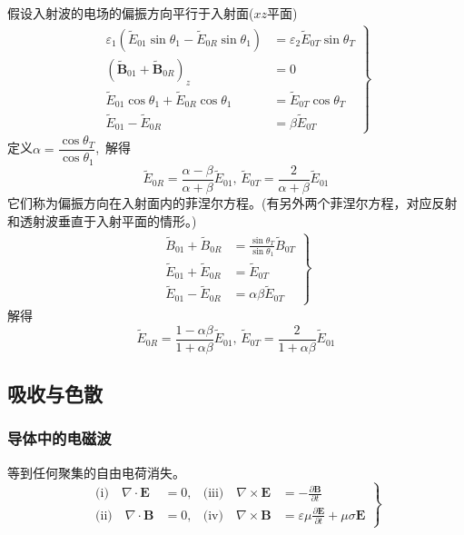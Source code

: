 假设入射波的电场的偏振方向平行于入射面($xz$平面)
\begin{align*}
\left.\begin{aligned}
\varepsilon_1\left(\widetilde{{E}}_{01}\sin\theta_1-\widetilde{{E}}_{0R}\sin\theta_1\right)&= \varepsilon_2\widetilde{{E}}_{0T}\sin\theta_T\\
\left(\widetilde{\boldsymbol{B}}_{01}+\widetilde{\boldsymbol{B}}_{0R}\right)_z&=0\\
\widetilde{{E}}_{01}\cos\theta_1+\widetilde{{E}}_{0R}\cos\theta_1&= \widetilde{{E}}_{0T}\cos\theta_T\\
\widetilde{E}_{01}-\widetilde{E}_{0R}&= \beta\widetilde{E}_{0T}
\end{aligned}\right\}
\end{align*}
定义$\alpha=\dfrac{\cos\theta_T}{\cos\theta_1}$,\, 解得
\begin{equation}
    \widetilde{E}_{0R}=\frac{\alpha-\beta}{\alpha+\beta}\widetilde{E}_{01},\, \widetilde{E}_{0T}=\frac{2}{\alpha+\beta}\widetilde{E}_{01}\label{偏振方向在入射面内的菲涅尔方程}
\end{equation}
它们称为偏振方向在入射面内的菲涅尔方程。(有另外两个菲涅尔方程，对应反射和透射波垂直于入射平面的情形。)
\begin{align*}
\left.\begin{aligned}
\widetilde{B}_{01}+\widetilde{B}_{0R}&=\frac{\sin\theta_T}{\sin\theta_1} \widetilde{B}_{0T}\\
\widetilde{{E}}_{01}+\widetilde{{E}}_{0R}&= \widetilde{{E}}_{0T}\\
\widetilde{E}_{01}-\widetilde{E}_{0R}&=\alpha\beta\widetilde{E}_{0T}
\end{aligned}\right\}
\end{align*}
解得
\begin{equation}
    \widetilde{E}_{0R}=\frac{1-\alpha\beta}{1+\alpha\beta}\widetilde{E}_{01},\, \widetilde{E}_{0T}=\frac{2}{1+\alpha\beta}\widetilde{E}_{01}
\end{equation}
\subsection{吸收与色散}
\subsubsection{导体中的电磁波}
等到任何聚集的自由电荷消失。
\begin{equation}
\left.\begin{aligned}
\text{(i)} \quad \nabla \cdot \boldsymbol{E} &= 0, & \text{(iii)} \quad \nabla \times \boldsymbol{E} &= -\frac{\partial \boldsymbol{B}}{\partial t} \\
\text{(ii)} \quad \nabla \cdot \boldsymbol{B} &= 0, & \text{(iv)} \quad \nabla \times \boldsymbol{B} &= \varepsilon\mu \frac{\partial \boldsymbol{E}}{\partial t}+\mu\sigma\boldsymbol{E}
\end{aligned}\right\}
\end{equation}

